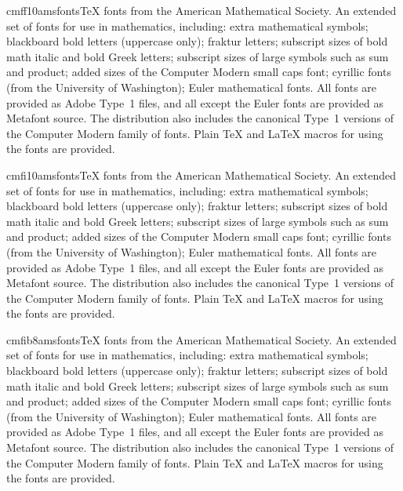 \documentclass{ddltxtyp}
\begin{document}
\begin{package}{cmff10}{amsfonts}{{\TeX} fonts from the American Mathematical Society.}
An extended set of fonts for use in mathematics, including:
extra mathematical symbols; blackboard bold letters (uppercase
only); fraktur letters; subscript sizes of bold math italic and
bold Greek letters; subscript sizes of large symbols such as
sum and product; added sizes of the Computer Modern small caps
font; cyrillic fonts (from the University of Washington); Euler
mathematical fonts. All fonts are provided as Adobe Type~1
files, and all except the Euler fonts are provided as Metafont
source. The distribution also includes the canonical Type~1
versions of the Computer Modern family of fonts. Plain {\TeX} and
{\LaTeX} macros for using the fonts are provided.
\end{package}
\begin{package}{cmfi10}{amsfonts}{{\TeX} fonts from the American Mathematical Society.}
An extended set of fonts for use in mathematics, including:
extra mathematical symbols; blackboard bold letters (uppercase
only); fraktur letters; subscript sizes of bold math italic and
bold Greek letters; subscript sizes of large symbols such as
sum and product; added sizes of the Computer Modern small caps
font; cyrillic fonts (from the University of Washington); Euler
mathematical fonts. All fonts are provided as Adobe Type~1
files, and all except the Euler fonts are provided as Metafont
source. The distribution also includes the canonical Type~1
versions of the Computer Modern family of fonts. Plain {\TeX} and
{\LaTeX} macros for using the fonts are provided.
\end{package}
\begin{package}{cmfib8}{amsfonts}{{\TeX} fonts from the American Mathematical Society.}
An extended set of fonts for use in mathematics, including:
extra mathematical symbols; blackboard bold letters (uppercase
only); fraktur letters; subscript sizes of bold math italic and
bold Greek letters; subscript sizes of large symbols such as
sum and product; added sizes of the Computer Modern small caps
font; cyrillic fonts (from the University of Washington); Euler
mathematical fonts. All fonts are provided as Adobe Type~1
files, and all except the Euler fonts are provided as Metafont
source. The distribution also includes the canonical Type~1
versions of the Computer Modern family of fonts. Plain {\TeX} and
{\LaTeX} macros for using the fonts are provided.
\end{package}
\end{document}
